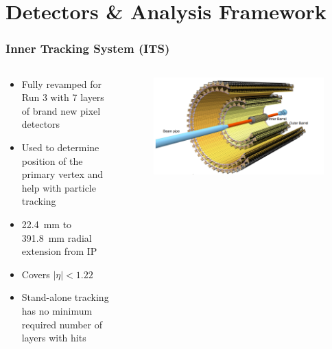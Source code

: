 \documentclass[10pt]{beamer}
\begin{document}
\section{Detectors \& Analysis Framework}

\begin{frame}
    \frametitle{Inner Tracking System (ITS)}

    \begin{columns}[c]
        \begin{column}{0.4\textwidth}
            \begin{itemize}
                \item Fully revamped for Run 3 with 7 layers of brand new pixel detectors
                \item Used to determine position of the primary vertex and help with particle tracking
                \item \SI{22.4}{\milli\metre} to \SI{391.8}{\milli\metre} radial extension from IP
                \item Covers $|\eta| < 1.22$
                \item Stand-alone tracking has no minimum required number of layers with hits
            \end{itemize}
        \end{column}

        \begin{column}{0.6\textwidth}
            \begin{figure}[h]
                \begin{center}
                    \includegraphics[width=\textwidth]{Figs/ITS_Schematic.png}
                \end{center}
            \end{figure}
        \end{column}
    \end{columns}

\end{frame}
\end{document}
